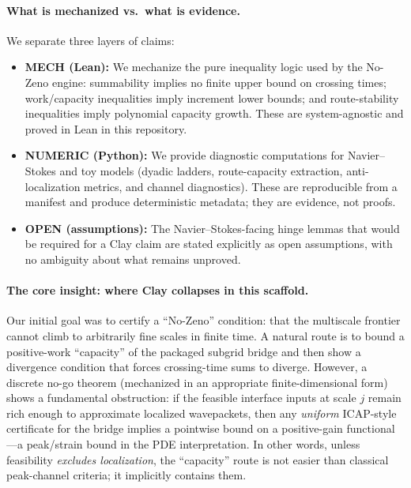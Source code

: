 \documentclass[11pt]{article}
\begin{document}
\paragraph{What is mechanized vs.\ what is evidence.}
We separate three layers of claims:
\begin{itemize}
\item \textbf{MECH (Lean):} We mechanize the pure inequality logic used by the No-Zeno engine: summability implies no finite upper bound on crossing times; work/capacity inequalities imply increment lower bounds; and route-stability inequalities imply polynomial capacity growth. These are system-agnostic and proved in Lean in this repository.
\item \textbf{NUMERIC (Python):} We provide diagnostic computations for Navier--Stokes and toy models (dyadic ladders, route-capacity extraction, anti-localization metrics, and channel diagnostics). These are reproducible from a manifest and produce deterministic metadata; they are evidence, not proofs.
\item \textbf{OPEN (assumptions):} The Navier--Stokes-facing hinge lemmas that would be required for a Clay claim are stated explicitly as open assumptions, with no ambiguity about what remains unproved.
\end{itemize}

\paragraph{The core insight: where Clay collapses in this scaffold.}
Our initial goal was to certify a ``No-Zeno'' condition: that the multiscale frontier cannot climb to arbitrarily fine scales in finite time. A natural route is to bound a positive-work ``capacity'' of the packaged subgrid bridge and then show a divergence condition that forces crossing-time sums to diverge. However, a discrete no-go theorem (mechanized in an appropriate finite-dimensional form) shows a fundamental obstruction: if the feasible interface inputs at scale $j$ remain rich enough to approximate localized wavepackets, then any \emph{uniform} ICAP-style certificate for the bridge implies a pointwise bound on a positive-gain functional---a peak/strain bound in the PDE interpretation. In other words, unless feasibility \emph{excludes localization}, the ``capacity'' route is not easier than classical peak-channel criteria; it implicitly contains them.
\end{document}
